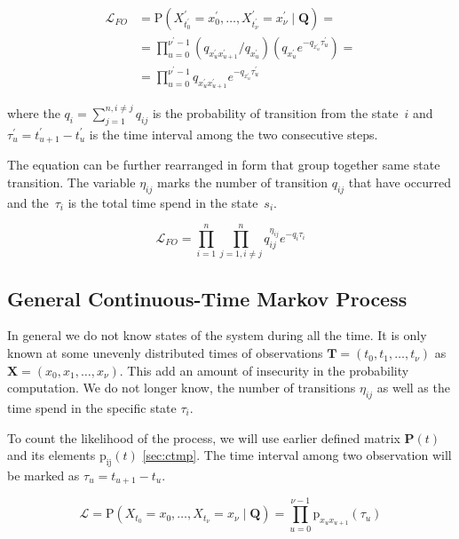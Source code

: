 \documentclass[thesis=M,english]{FITthesis}[2012/10/20]
\newcommand{\matr}[1]{\mathbf{#1}}
\begin{document}
\begin{equation}\label{eq:CL1}
\begin{aligned}
 \mathcal{L}_{FO} &= \mathrm{P}(X_{t_0^{'}}^{'} = x_0^{'}, \dots ,X_{t_{\nu}^{'}}^{'} = x_\nu^{'} \mid \matr{Q} ) = \\ 
 &=  \prod_{u=0}^{\nu^{'}-1} ( q_{x_u^{'} x_{u+1}^{'}} / q_{x_u^{'}} )( q_{x_u^{'}} e^{ - q_{x_u^{'}} \tau_{u }^{'}}) = \\
    &= \prod_{u=0}^{\nu^{'}-1} q_{x_u^{'} x_{u+1}^{'}} e^{ - q_{x_u^{'}} \tau_{u}^{'}}
\end{aligned}
\end{equation}

where the $q_i = \sum_{j=1}^{n,i\neq j} q_{ij}$ is the probability of transition from the state~$i$ and   
$\tau_{u}^{'} = t_{u+1}^{'} - t_{u}^{'}$ is the time interval among the two consecutive steps.

The equation can be further rearranged in form that group together same state transition. The variable $\eta_{ij}$ marks the number of transition $q_{ij}$ that have occurred and the~$\tau_i$ is the total time spend in the state~$s_i$.

\begin{equation}\label{eq:CL2}
 \mathcal{L}_{FO} = \prod_{i=1}^{n} \prod_{j=1,i \neq j}^{n} q_{ij}^{\eta_{ij} } e^{ - q_i \tau_i }
\end{equation}

\subsection{ General Continuous-Time Markov Process }

In general we do not know states of the system during all the time. It is only known at some unevenly distributed times of observations $\matr{T} = ( t_0, t_1, \dots, t_{\nu} )$ as $\matr{X}= (x_0, x_1, \dots, x_{\nu} )$. 
This add an amount of insecurity in the probability computation. We do not longer know, the number of transitions $\eta_{ij}$ as well as the time spend in the specific state $\tau_i$. 

To count the likelihood of the process, we will use earlier defined matrix $\matr{P}(t)$ and its elements $\mathrm{p_{ij}}(t)$ \ref{sec:ctmp}. The time interval among two observation will be marked as  $\tau_u = t_{u+1} - t_u$.    

\begin{equation}
 \mathcal{L} = \mathrm{P}(X_{t_0} = x_0, \dots ,X_{t_\nu} = x_\nu \mid \matr{Q} ) = \prod_{u=0}^{\nu-1} \mathrm{p}_{x_u x_{u+1}}(\tau_u) 
\end{equation}
\end{document}
